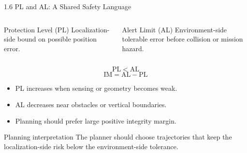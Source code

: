 \documentclass[10pt,aspectratio=169,xcolor=dvipsnames]{beamer}
\newcommand{\PL}{\mathrm{PL}}
\newcommand{\AL}{\mathrm{AL}}
\newcommand{\IM}{\mathrm{IM}}
\newcommand{\tightitem}{\setlength{\itemsep}{2pt}\setlength{\parskip}{0pt}\setlength{\parsep}{0pt}}
\begin{document}
\begin{frame}[t]{1.6 PL and AL: A Shared Safety Language}
  \small

  \begin{columns}[T,totalwidth=\textwidth]
    \begin{block}{Protection Level (PL)}
      Localization-side bound on possible position error.
    \end{block}

    \begin{block}{Alert Limit (AL)}
      Environment-side tolerable error before collision or mission hazard.
    \end{block}
  \end{columns}

  \vspace{-2mm}

  \begin{center}
    \Large
    \[
      \PL < \AL
    \]
    \vspace{-6mm}
    \[
      \IM = \AL - \PL
    \]
  \end{center}

  \vspace{-1mm}

  \begin{itemize}\tightitem
    \item PL increases when sensing or geometry becomes weak.
    \item AL decreases near obstacles or vertical boundaries.
    \item Planning should prefer large positive integrity margin.
  \end{itemize}


  \begin{exampleblock}{Planning interpretation}
    The planner should choose trajectories that keep the localization-side risk below the environment-side tolerance.
  \end{exampleblock}

\end{frame}
\end{document}
